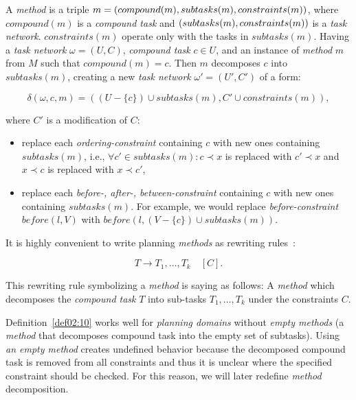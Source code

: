 \begin{defn}\label{def02:10}
    A \emph{method} is a triple $m = (compound(m),subtasks(m), \\ constraints(m))$, where $compound(m)$ is a \emph{compound  task} and $(subtasks(m), \\ constraints(m))$ is a \emph{task network}. $constraints(m)$ operate only with the tasks in $subtasks(m)$. Having a \emph{task network} $\omega=(U,C)$, \emph{compound task} $c \in U$, and an instance of \emph{method} $m$ from $M$ such that $compound(m) = c$. Then $m$ decomposes $c$ into $subtasks(m)$, creating a new \emph{task network} $\omega'=(U',C')$ of a form:

    \[
    \delta(\omega,c,m) = ((U-\{c\}) \cup subtasks(m), C' \cup constraints(m)),
    \]

    \noindent
    where $C'$ is a modification of $C$:

    \begin{itemize}
        \item replace each \emph{ordering-constraint} containing $c$ with new ones containing $subtasks(m)$, i.e., $\forall c' \in subtasks(m): c \prec x$ is replaced with $c' \prec x$ and $x \prec c$ is replaced with $x \prec c'$,
        
        \item replace each \emph{before-, after-, between-constraint} containing $c$ with new ones containing $subtasks(m)$. For example, we would replace \emph{before-constraint} $before(l,V)$ with $before(l,(V - \{c\}) \cup subtasks(m))$.
    \end{itemize}
\end{defn}

\medbreak\noindent
It is highly convenient to write planning \emph{methods} as rewriting rules~\cite{ondrckova2023semantics}:

\[
T \rightarrow T_1,\dots,T_k \quad [C].
\]

\noindent
This rewriting rule symbolizing a \emph{method} is saying as follows: A \emph{method} which decomposes the \emph{compound task} $T$ into sub-tasks $T_1,\dots,T_k$ under the constraints $C$.

\medbreak\noindent
Definition~\ref{def02:10} works well for \emph{planning domains} without \emph{empty methods} (a \emph{method} that decomposes compound task into the empty set of subtasks). Using \emph{an empty method} creates undefined behavior because the decomposed compound task is removed from all constraints and thus it is unclear where the specified constraint should be checked. For this reason, we will later redefine \emph{method} decomposition. 

